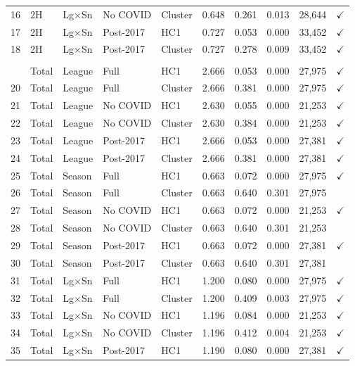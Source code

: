 \begin{table}[htbp]
\begin{threeparttable}
\begin{tabular}{clllllrrrr}
16 & 2H & Lg$\times$Sn & No COVID & Cluster & 0.648 & 0.261 & 0.013 & 28,644 & $\checkmark$ \\
17 & 2H & Lg$\times$Sn & Post-2017 & HC1 & 0.727 & 0.053 & 0.000 & 33,452 & $\checkmark$ \\
18 & 2H & Lg$\times$Sn & Post-2017 & Cluster & 0.727 & 0.278 & 0.009 & 33,452 & $\checkmark$ \\
\addlinespace
\multicolumn{10}{l}{\textit{Panel B: Total stoppage time}} \\
\addlinespace[3pt]
19 & Total & League & Full & HC1 & 2.666 & 0.053 & 0.000 & 27,975 & $\checkmark$ \\
20 & Total & League & Full & Cluster & 2.666 & 0.381 & 0.000 & 27,975 & $\checkmark$ \\
21 & Total & League & No COVID & HC1 & 2.630 & 0.055 & 0.000 & 21,253 & $\checkmark$ \\
22 & Total & League & No COVID & Cluster & 2.630 & 0.384 & 0.000 & 21,253 & $\checkmark$ \\
23 & Total & League & Post-2017 & HC1 & 2.666 & 0.053 & 0.000 & 27,381 & $\checkmark$ \\
24 & Total & League & Post-2017 & Cluster & 2.666 & 0.381 & 0.000 & 27,381 & $\checkmark$ \\
25 & Total & Season & Full & HC1 & 0.663 & 0.072 & 0.000 & 27,975 & $\checkmark$ \\
26 & Total & Season & Full & Cluster & 0.663 & 0.640 & 0.301 & 27,975 & \\
27 & Total & Season & No COVID & HC1 & 0.663 & 0.072 & 0.000 & 21,253 & $\checkmark$ \\
28 & Total & Season & No COVID & Cluster & 0.663 & 0.640 & 0.301 & 21,253 & \\
29 & Total & Season & Post-2017 & HC1 & 0.663 & 0.072 & 0.000 & 27,381 & $\checkmark$ \\
30 & Total & Season & Post-2017 & Cluster & 0.663 & 0.640 & 0.301 & 27,381 & \\
31 & Total & Lg$\times$Sn & Full & HC1 & 1.200 & 0.080 & 0.000 & 27,975 & $\checkmark$ \\
32 & Total & Lg$\times$Sn & Full & Cluster & 1.200 & 0.409 & 0.003 & 27,975 & $\checkmark$ \\
33 & Total & Lg$\times$Sn & No COVID & HC1 & 1.196 & 0.084 & 0.000 & 21,253 & $\checkmark$ \\
34 & Total & Lg$\times$Sn & No COVID & Cluster & 1.196 & 0.412 & 0.004 & 21,253 & $\checkmark$ \\
35 & Total & Lg$\times$Sn & Post-2017 & HC1 & 1.190 & 0.080 & 0.000 & 27,381 & $\checkmark$ \\

\end{tabular}
\end{threeparttable}
\end{table}
